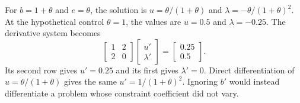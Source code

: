 For $b=1+\theta$ and $e=\theta$, the solution is $u=\theta/(1+\theta)$ and $\lambda=-\theta/(1+\theta)^2$. At the hypothetical control $\theta=1$, the values are $u=0.5$ and $\lambda=-0.25$. The derivative system becomes
\begin{equation}
\begin{bmatrix}1&2\\2&0\end{bmatrix}
\begin{bmatrix}u'\\\lambda'\end{bmatrix}
=\begin{bmatrix}0.25\\0.5\end{bmatrix}.
\end{equation}
Its second row gives $u'=0.25$ and its first gives $\lambda'=0$. Direct differentiation of $u=\theta/(1+\theta)$ gives the same $u'=1/(1+\theta)^2$. Ignoring $b'$ would instead differentiate a problem whose constraint coefficient did not vary.

